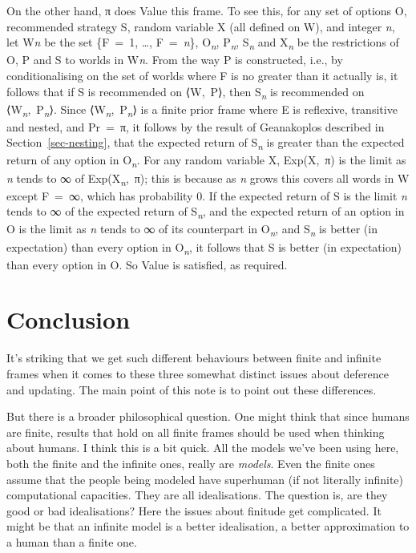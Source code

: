 \documentclass[
  10pt,
  letterpaper,
  DIV=11,
  numbers=noendperiod,
  twoside]{scrartcl}
\begin{document}
On the other hand, π does Value this frame. To see this, for any set of
options O, recommended strategy S, random variable X (all defined on W),
and integer \emph{n}, let W\emph{n} be the set \{F~=~1, \ldots,
F~=~\emph{n}\}, O\textsubscript{\emph{n}}, P\textsubscript{\emph{n}},
S\textsubscript{\emph{n}} and X\textsubscript{\emph{n}} be the
restrictions of O, P and S to worlds in W\emph{n}. From the way P is
constructed, i.e., by conditionalising on the set of worlds where F is
no greater than it actually is, it follows that if S is recommended on
⟨W,~P⟩, then S\textsubscript{\emph{n}} is recommended on
⟨W\textsubscript{\emph{n}},~P\textsubscript{\emph{n}}⟩. Since
⟨W\textsubscript{\emph{n}},~P\textsubscript{\emph{n}}⟩ is a finite prior
frame where E is reflexive, transitive and nested, and Pr~=~π, it
follows by the result of Geanakoplos described in
Section~\ref{sec-nesting}, that the expected return of
S\textsubscript{\emph{n}} is greater than the expected return of any
option in O\textsubscript{\emph{n}}. For any random variable X,
Exp(X,~π) is the limit as \emph{n} tends to ∞ of
Exp(X\textsubscript{\emph{n}},~π); this is because as \emph{n} grows
this covers all words in W except F~=~∞, which has probability 0. If the
expected return of S is the limit \emph{n} tends to ∞ of the expected
return of S\emph{\textsubscript{n}}, and the expected return of an
option in O is the limit as \emph{n} tends to ∞ of its counterpart in
O\textsubscript{\emph{n}}, and S\emph{\textsubscript{n}} is better (in
expectation) than every option in O\textsubscript{\emph{n}}, it follows
that S is better (in expectation) than every option in O. So Value is
satisfied, as required.

\section{Conclusion}\label{conclusion}

It's striking that we get such different behaviours between finite and
infinite frames when it comes to these three somewhat distinct issues
about deference and updating. The main point of this note is to point
out these differences.

But there is a broader philosophical question. One might think that
since humans are finite, results that hold on all finite frames should
be used when thinking about humans. I think this is a bit quick. All the
models we've been using here, both the finite and the infinite ones,
really are \emph{models}. Even the finite ones assume that the people
being modeled have superhuman (if not literally infinite) computational
capacities. They are all idealisations. The question is, are they good
or bad idealisations? Here the issues about finitude get complicated. It
might be that an infinite model is a better idealisation, a better
approximation to a human than a finite one.
\end{document}
